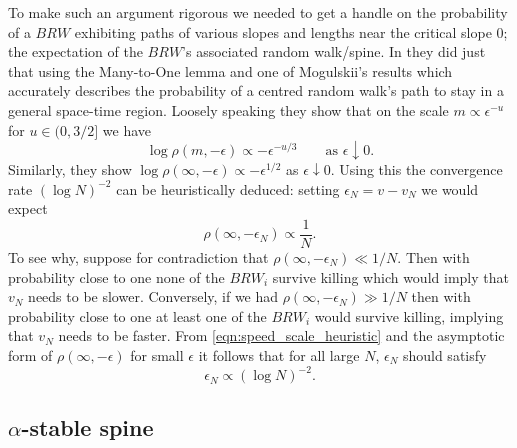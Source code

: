 To make such an argument rigorous we needed to get a handle on the probability of a $BRW$ exhibiting paths of various slopes and lengths near the critical slope $0$; the expectation of the $BRW$'s associated random walk/spine. In \cite{gantert2008asymptotics} they did just that using the Many-to-One lemma and one of Mogulskii's results which accurately describes the probability of a centred random walk's path to stay in a general space-time region. Loosely speaking they show that on the scale $m \propto \epsilon^{-u}$ for $u \in (0, 3/2]$ we have
\begin{equation}\nonumber
\log \rho(m, -\epsilon) \propto - \epsilon^{-u/3}\qquad\text{as } \epsilon \downarrow 0. 
\end{equation}
Similarly, they show $\log\rho(\infty, -\epsilon) \propto - \epsilon^{1/2}$ as $\epsilon \downarrow 0$. Using this the convergence rate $(\log N)^{-2}$ can be heuristically deduced: setting $\epsilon_N = v - v_N$ we would expect 
\begin{equation}\label{eqn:speed_scale_heuristic}
\rho(\infty, - \epsilon_N) \propto \frac{1}{N}. 
\end{equation}
To see why, suppose for contradiction that $\rho(\infty, - \epsilon_N) \ll 1/N$. Then with probability close to one none of the $BRW_i$ survive killing which would imply that $v_N$ needs to be slower. Conversely, if we had $\rho(\infty, - \epsilon_N) \gg 1/N$ then with probability close to one at least one of the $BRW_i$ would survive killing, implying that $v_N$ needs to be faster. From \ref{eqn:speed_scale_heuristic} and the asymptotic form of $\rho(\infty, -\epsilon)$ for small $\epsilon$ it follows that for all large $N$, $\epsilon_N$ should satisfy
\begin{equation}\nonumber
\epsilon_N \propto (\log N)^{-2}. 
\end{equation}

\subsection{$\alpha$-stable spine}\label{subsec:alpha_stable_spine}

